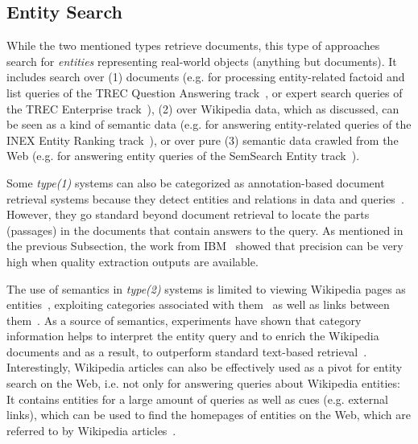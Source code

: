 \subsection{Entity Search} While the two mentioned types retrieve documents, this type of approaches search for \emph{entities} representing real-world objects (anything but documents). It includes search over (1) documents (e.g. for processing entity-related factoid and list queries of the TREC Question Answering track~\cite{DBLP:conf/sigir/Chu-CarrollPCFD06}, or expert search queries of the TREC Enterprise track~\cite{DBLP:journals/ipm/BalogAR09}), 
(2) over 
Wikipedia data, which as discussed, can be seen as a kind of semantic data (e.g. for answering entity-related queries of the INEX Entity Ranking track~\cite{DBLP:conf/cikm/KapteinSVK10,DBLP:conf/ecir/PehcevskiVT08}), or over pure (3) semantic data crawled from the Web (e.g. for answering entity queries of the SemSearch Entity track~\cite{DBLP:conf/semweb/BlancoMV11}).  

Some \emph{type(1)} systems can also be categorized as annotation-based document retrieval systems because they detect entities and relations in data and queries~\cite{DBLP:conf/vldb/ChengYC07,DBLP:conf/www/NieMSWM07,DBLP:conf/sigir/Chu-CarrollPCFD06}. However, they go standard beyond document retrieval to locate the parts (passages) in the documents that contain answers to the query. As mentioned in the previous Subsection, the work from IBM~\cite{DBLP:conf/sigir/Chu-CarrollPCFD06} showed that precision can be very high when quality extraction outputs are available. 

The use of semantics in \emph{type(2)} systems is limited to viewing Wikipedia pages as entities~\cite{DBLP:conf/cikm/KapteinSVK10}, exploiting categories associated with them~\cite{DBLP:journals/tois/BalogBR11} as well as links between them~\cite{DBLP:conf/ecir/PehcevskiVT08}. As a source of semantics, experiments have shown that category information helps to interpret the entity query and to enrich the Wikipedia documents and as a result, to outperform standard text-based retrieval~\cite{DBLP:conf/cikm/KapteinSVK10,DBLP:journals/tois/BalogBR11}. Interestingly, 
Wikipedia articles can also be effectively used as a pivot for entity search on the Web, i.e. not only for answering queries about Wikipedia entities: It contains entities for a large amount of queries as well as cues (e.g. external links), which can be used to find the homepages of entities on the Web, which are referred to by Wikipedia articles~\cite{DBLP:conf/cikm/KapteinSVK10}. 

